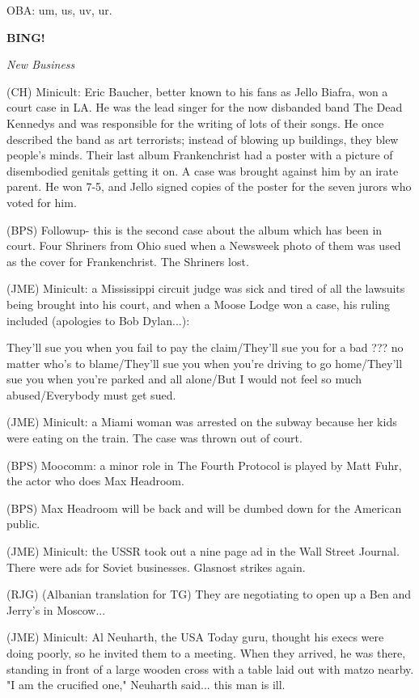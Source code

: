 \documentclass[12pt]{article}
\newcommand{\bing}{{\bf BING!} }
\newcommand{\goto}[1]{\bing \vskip 12pt \centerline{{\em{#1}}}}
\begin{document}
OBA: um, us, uv, ur.

\goto{New Business}

(CH) Minicult: Eric Baucher, better known to his fans as Jello Biafra, won a court case in LA. He was the lead singer for the now disbanded band The Dead Kennedys and was responsible for the writing of lots of their songs. He once described the band as art terrorists; instead of blowing up buildings, they blew people's minds. Their last album Frankenchrist had a poster with a picture of disembodied genitals getting it on. A case was brought against him by an irate parent. He won 7-5, and Jello signed copies of the poster for the seven jurors who voted for him.

(BPS) Followup- this is the second case about the album which has been in court. Four Shriners from Ohio sued when a Newsweek photo of them was used as the cover for Frankenchrist. The Shriners lost.

(JME) Minicult: a Mississippi circuit judge was sick and tired of all the lawsuits being brought into his court, and when a Moose Lodge won a case, his ruling included (apologies to Bob Dylan...):

They'll sue you when you fail to pay the claim/They'll sue you for a bad ??? no matter who's to blame/They'll sue you when you're driving to go home/They'll sue you when you're parked and all alone/But I would not feel so much abused/Everybody must get sued.

(JME) Minicult: a Miami woman was arrested on the subway because her kids were eating on the train. The case was thrown out of court.

(BPS) Moocomm: a minor role in The Fourth Protocol is played by Matt Fuhr, the actor who does Max Headroom.

(BPS) Max Headroom will be back and will be dumbed down for the American public.

(JME) Minicult: the USSR took out a nine page ad in the Wall Street Journal. There were ads for Soviet businesses. Glasnost strikes again.

(RJG) (Albanian translation for TG) They are negotiating to open up a Ben and Jerry's in Moscow...

(JME) Minicult: Al Neuharth, the USA Today guru, thought his execs were doing poorly, so he invited them to a meeting. When they arrived, he was there, standing in front of a large wooden cross with a table laid out with matzo nearby. "I am the crucified one," Neuharth said... this man is ill.
\end{document}
